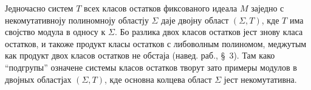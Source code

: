 ﻿\documentclass[11pt]{article}
\begin{document}
Једночасно систем \(T\) всех класов остатков фиксованого идеала \(M\) заједно с некомутативноју полиномноју областју \(\Sigma\) даје двојну област \((\Sigma,T)\), кде \(T\) има својство модула в односу к \(\Sigma\). Бо разлика двох класов остатков јест знову класа остатков, и такоже продукт класы остатков с либоволным полиномом, меджутым как продукт двох класов остатков не обстаја (навед. раб., \S~3). Там како ``подгрупы'' означене системы класов остатков творут зато примеры модулов в двојных областјах \((\Sigma,T)\), кде основна колцева област \(\Sigma\) јест некомутативна.
\end{document}
